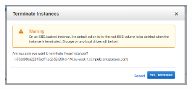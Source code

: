 \documentclass[english,runningheads,a4paper]{llncs}[2018/03/10]
\newenvironment{nscenter}
 {\parskip=0pt\par\nopagebreak\centering}
 {\par\noindent\ignorespacesafterend}
\begin{document}
\begin{nscenter}
\includegraphics[width=8cm,height=8cm,keepaspectratio]{./Contenedores/AWS/42.png}
\end{nscenter}

\newpage
\end{document}
